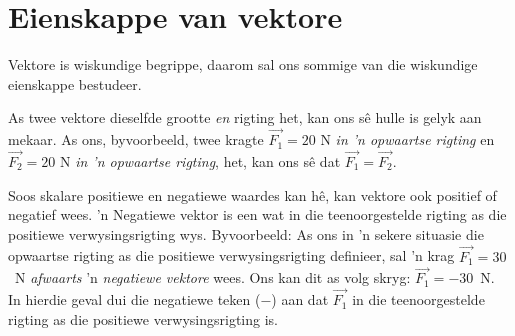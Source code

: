 \section{Eienskappe van vektore}
    \nopagebreak
    \label{m38813*cid7}
      \label{m38813*id188277}

Vektore is wiskundige begrippe, daarom sal ons sommige van die wiskundige eienskappe bestudeer.

As twee vektore dieselfde grootte \textit{en} rigting het, kan ons sê hulle is gelyk aan mekaar. As ons, byvoorbeeld, twee kragte  $\stackrel{\to }{F_{1}} = 20$ N \textit{in  'n opwaartse rigting} en $\stackrel{\to }{F_{2}} = 20$ N \textit{in  'n opwaartse rigting}, het, kan ons s\^{e} dat $\stackrel{\to }{F_{1}} = \stackrel{\to }{F_{2}}$.



Soos skalare positiewe en negatiewe waardes kan hê, kan vektore ook positief of negatief wees.  'n Negatiewe vektor is een wat in die teenoorgestelde rigting as die positiewe verwysingsrigting wys. Byvoorbeeld: As ons in  'n sekere situasie die opwaartse rigting as die positiewe verwysingsrigting definieer, sal  'n krag $\stackrel{\to }{F_{1}} = 30$~N \textit{afwaarts} 'n \textit{negatiewe vektore} wees. Ons kan dit as volg skryg: $\stackrel{\to }{F_{1}} = -30$~N. In hierdie geval dui die negatiewe teken ($-$) aan dat $\stackrel{\to }{F_{1}}$ in die teenoorgestelde rigting as die positiewe verwysingsrigting is.


